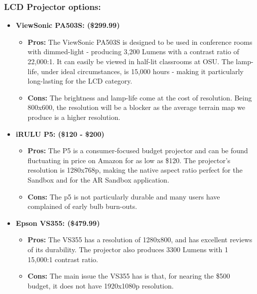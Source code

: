 \documentclass[IEEEtran]{article}
\begin{document}
\subsubsection{LCD Projector options:}
\begin{itemize}
    \item \textbf{ViewSonic PA503S: (\$299.99)}
    \begin{itemize}
        \item \textbf{Pros: } The ViewSonic PA503S is designed to be used in conference rooms with dimmed-light - producing 3,200 Lumens with a contrast ratio of 22,000:1. It can easily be viewed in half-lit classrooms at OSU. The lamp-life, under ideal circumstances, is 15,000 hours - making it particularly long-lasting for the LCD category. 
        \item \textbf{Cons: } The brightness and lamp-life come at the cost of resolution. Being 800x600, the resolution will be a blocker as the average terrain map we produce is a higher resolution. 
    \end{itemize}
    \item \textbf{iRULU P5: (\$120 - \$200)}
    \begin{itemize}
        \item \textbf{Pros: } The P5 is a consumer-focused budget projector and can be found fluctuating in price on Amazon for as low as \$120. The projector's resolution is 1280x768p, making the native aspect ratio perfect for the Sandbox and for the AR Sandbox application. 
        \item \textbf{Cons: } The p5 is not particularly durable and many users have complained of early bulb burn-outs.
    \end{itemize}
    \item \textbf{Epson VS355: (\$479.99)}
    \begin{itemize}
        \item \textbf{Pros: } The VS355 has a  resolution of 1280x800, and has excellent reviews of its durability. The projector also produces 3300 Lumens with 1 15,000:1 contrast ratio.
        \item \textbf{Cons: } The main issue the VS355 has is that, for nearing the \$500 budget, it does not have 1920x1080p resolution. 
    \end{itemize}
\end{itemize}
\end{document}

